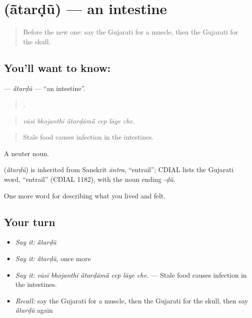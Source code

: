 \section[\texorpdfstring{\gu{આંતરડું} (ā̃tarḍũ)}{આંતરડું (ā̃tarḍũ)}]{ (ā̃tarḍũ) — an intestine}

\label{lesson:GU-C472-atardu}



\begin{quote}
Before the new one: say the Gujarati for a muscle, then the Gujarati for the skull.
\end{quote}

\subsection*{You'll want to know: }
\textbf{} — \emph{ā̃tarḍũ} — \textquotedblleft{}an intestine\textquotedblright{}.

\begin{quote}
     .
\end{quote}

\begin{quote}
\emph{vāsī bhojanthī ā̃tarḍāmā̃ cep lāge che.}
\end{quote}

\begin{quote}
Stale food causes infection in the intestines.
\end{quote}

A neuter noun.

\begin{cousinweb}
\textbf{} (\emph{ā̃tarḍũ}) is inherited from Sanskrit \emph{āntra}, \textquotedblleft{}entrail\textquotedblright{}; CDIAL lists the Gujarati word, \textquotedblleft{}entrail\textquotedblright{} (CDIAL 1182), with the noun ending \emph{-ḍũ}.
\end{cousinweb}

\begin{grammarlens}[title={What you've built}]
One more word for describing what you lived and felt.
\end{grammarlens}

\subsection*{Your turn}
\begin{itemize}
\raggedright
  \item \emph{Say it:} \emph{ā̃tarḍũ}
  \item \emph{Say it:} \emph{ā̃tarḍũ}, once more
  \item \emph{Say it:} \emph{vāsī bhojanthī ā̃tarḍāmā̃ cep lāge che.} — Stale food causes infection in the intestines.
  \item \emph{Recall:} say the Gujarati for a muscle, then the Gujarati for the skull, then say \emph{ā̃tarḍũ} again
\end{itemize}

